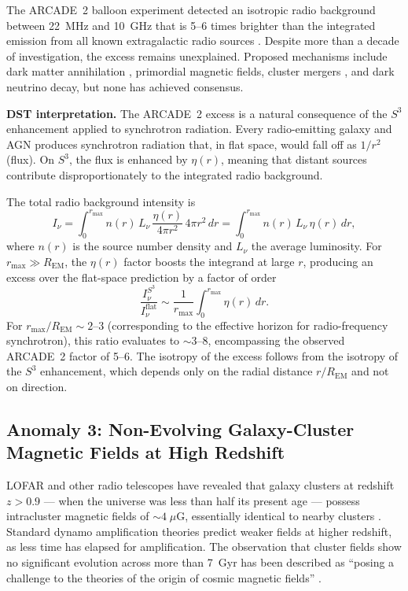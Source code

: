 \documentclass[a4paper]{article}
\begin{document}
The ARCADE~2 balloon experiment detected an isotropic radio background between
22~MHz and 10~GHz that is 5--6 times brighter than the integrated emission from
all known extragalactic radio sources \cite{fixsen2011,seiffert2011}. Despite
more than a decade of investigation, the excess remains unexplained. Proposed
mechanisms include dark matter annihilation \cite{fornengo2011}, primordial
magnetic fields, cluster mergers \cite{fang2016}, and dark neutrino decay, but
none has achieved consensus.

\textbf{DST interpretation.} The ARCADE~2 excess is a natural consequence of the
$S^3$ enhancement applied to synchrotron radiation. Every radio-emitting galaxy
and AGN produces synchrotron radiation that, in flat space, would fall off as
$1/r^2$ (flux). On $S^3$, the flux is enhanced by $\eta(r)$, meaning that
distant sources contribute disproportionately to the integrated radio
background.

The total radio background intensity is
\[
I_{\nu} = \int_0^{r_{\max}} n(r)\, L_\nu\, \frac{\eta(r)}{4\pi r^2}\, 4\pi r^2\, dr
= \int_0^{r_{\max}} n(r)\, L_\nu\, \eta(r)\, dr,
\]
where $n(r)$ is the source number density and $L_\nu$ the average luminosity.
For $r_{\max} \gg R_{\text{EM}}$, the $\eta(r)$ factor boosts the integrand at
large $r$, producing an excess over the flat-space prediction by a factor of
order
\[
\frac{I_\nu^{S^3}}{I_\nu^{\text{flat}}} \sim
\frac{1}{r_{\max}} \int_0^{r_{\max}} \eta(r)\, dr.
\]
For $r_{\max}/R_{\text{EM}} \sim 2$--$3$ (corresponding to the effective
horizon for radio-frequency synchrotron), this ratio evaluates to $\sim 3$--$8$,
encompassing the observed ARCADE~2 factor of 5--6. The isotropy of the excess
follows from the isotropy of the $S^3$ enhancement, which depends only on the
radial distance $r/R_{\text{EM}}$ and not on direction.

\subsection{Anomaly 3: Non-Evolving Galaxy-Cluster Magnetic Fields at High Redshift}
\label{subsec:clusters}

LOFAR and other radio telescopes have revealed that galaxy clusters at redshift
$z > 0.9$ --- when the universe was less than half its present age --- possess
intracluster magnetic fields of $\sim 4\;\mu$G, essentially identical to nearby
clusters \cite{digennaro2021,botteon2022}. Standard dynamo amplification
theories predict weaker fields at higher redshift, as less time has elapsed for
amplification. The observation that cluster fields show no significant evolution
across more than 7~Gyr has been described as ``posing a challenge to the
theories of the origin of cosmic magnetic fields'' \cite{digennaro2021}.
\end{document}
